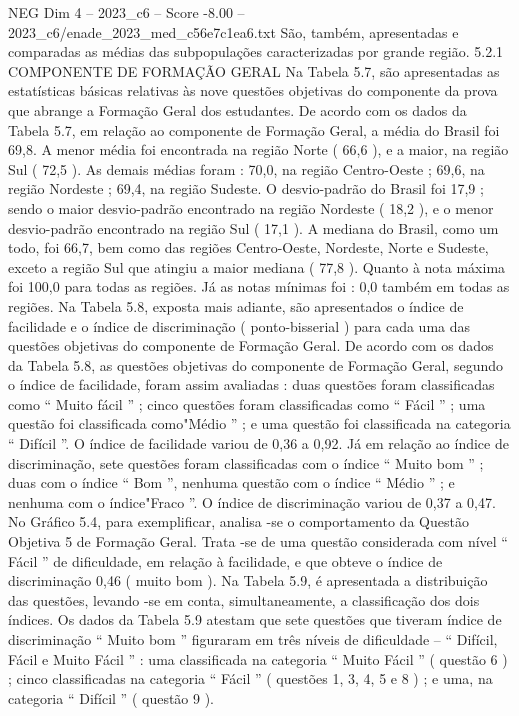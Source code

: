 \begin{textsample}{NEG Dim 4 – 2023\_c6 – Score -8.00 – 2023\_c6/enade\_2023\_med\_c56e7c1ea6.txt}
São, também, apresentadas e comparadas as médias das subpopulações caracterizadas por grande região. 5.2.1 COMPONENTE DE FORMAÇÃO GERAL Na Tabela 5.7, são apresentadas as estatísticas básicas relativas às nove questões objetivas do componente da prova que abrange a Formação Geral dos estudantes.
De acordo com os dados da Tabela 5.7, em relação ao componente de Formação Geral, a média do Brasil foi 69,8.
A menor média foi encontrada na região Norte ( 66,6 ), e a maior, na região Sul ( 72,5 ).
As demais médias foram : 70,0, na região Centro-Oeste ; 69,6, na região Nordeste ; 69,4, na região Sudeste.
O desvio-padrão do Brasil foi 17,9 ; sendo o maior desvio-padrão encontrado na região Nordeste ( 18,2 ), e o menor desvio-padrão encontrado na região Sul ( 17,1 ).
A mediana do Brasil, como um todo, foi 66,7, bem como das regiões Centro-Oeste, Nordeste, Norte e Sudeste, exceto a região Sul que atingiu a maior mediana ( 77,8 ).
Quanto à nota máxima foi 100,0 para todas as regiões.
Já as notas mínimas foi : 0,0 também em todas as regiões.
Na Tabela 5.8, exposta mais adiante, são apresentados o índice de facilidade e o índice de discriminação ( ponto-bisserial ) para cada uma das questões objetivas do componente de Formação Geral.
De acordo com os dados da Tabela 5.8, as questões objetivas do componente de Formação Geral, segundo o índice de facilidade, foram assim avaliadas : duas questões foram classificadas como “ Muito fácil ” ; cinco questões foram classificadas como “ Fácil ” ; uma questão foi classificada como"Médio ” ; e uma questão foi classificada na categoria “ Difícil ”.
O índice de facilidade variou de 0,36 a 0,92.
Já em relação ao índice de discriminação, sete questões foram classificadas com o índice “ Muito bom ” ; duas com o índice “ Bom ”, nenhuma questão com o índice “ Médio ” ; e nenhuma com o índice"Fraco ”.
O índice de discriminação variou de 0,37 a 0,47.
No Gráfico 5.4, para exemplificar, analisa -se o comportamento da Questão Objetiva 5 de Formação Geral.
Trata -se de uma questão considerada com nível “ Fácil ” de dificuldade, em relação à facilidade, e que obteve o índice de discriminação 0,46 ( muito bom ).
Na Tabela 5.9, é apresentada a distribuição das questões, levando -se em conta, simultaneamente, a classificação dos dois índices.
Os dados da Tabela 5.9 atestam que sete questões que tiveram índice de discriminação “ Muito bom ” figuraram em três níveis de dificuldade – “ Difícil, Fácil e Muito Fácil ” : uma classificada na categoria “ Muito Fácil ” ( questão 6 ) ; cinco classificadas na categoria “ Fácil ” ( questões 1, 3, 4, 5 e 8 ) ; e uma, na categoria “ Difícil ” ( questão 9 ).

\end{textsample}
